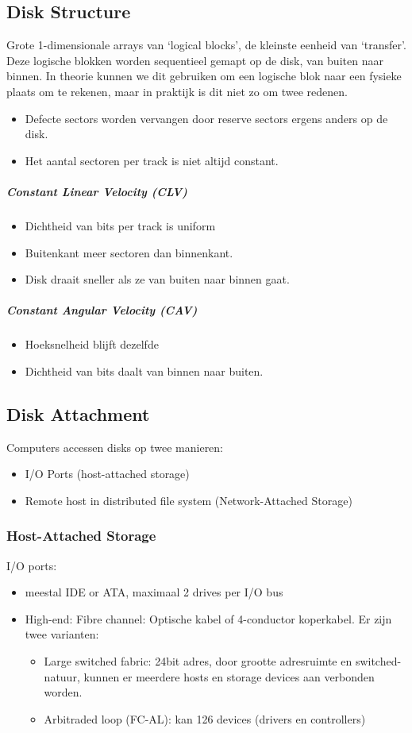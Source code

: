 \subsection{Disk Structure}
Grote 1-dimensionale arrays van `logical blocks', de kleinste eenheid van `transfer'. Deze logische blokken worden sequentieel gemapt op de disk, van buiten naar binnen. In theorie kunnen we dit gebruiken om een logische blok naar een fysieke plaats om te rekenen, maar in praktijk is dit niet zo om twee redenen.
\begin{itemize}
	\item Defecte sectors worden vervangen door reserve sectors ergens anders op de disk.
	\item Het aantal sectoren per track is niet altijd constant.
\end{itemize}
\subparagraph{Constant Linear Velocity (CLV)}
\begin{itemize}
	\item Dichtheid van bits per track is uniform
	\item Buitenkant meer sectoren dan binnenkant.
	\item Disk draait sneller als ze van buiten naar binnen gaat.
\end{itemize}
\subparagraph{Constant Angular Velocity (CAV)}
\begin{itemize}
	\item Hoeksnelheid blijft dezelfde
	\item Dichtheid van bits daalt van binnen naar buiten.
\end{itemize}

\subsection{Disk Attachment}
Computers accessen disks op twee manieren:
\begin{itemize}
	\item I/O Ports (host-attached storage)
	\item Remote host in distributed file system (Network-Attached Storage)
\end{itemize}
\subsubsection{Host-Attached Storage}
I/O ports:
\begin{itemize}
	\item meestal IDE or ATA, maximaal 2 drives per I/O bus
	\item High-end: Fibre channel: Optische kabel of 4-conductor koperkabel. Er zijn twee varianten:
	\begin{itemize}
		\item Large switched fabric: 24bit adres, door grootte adresruimte en switched-natuur, kunnen er meerdere hosts en storage devices aan verbonden worden.
		\item Arbitraded loop (FC-AL): kan 126 devices (drivers en controllers)
	\end{itemize}
\end{itemize}
